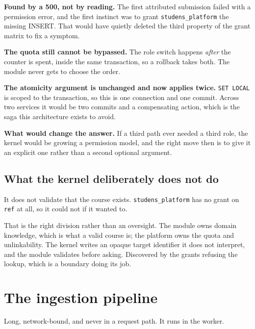 \documentclass[11pt,a4paper]{article}
\begin{document}
\begin{why}
\textbf{Found by a 500, not by reading.} The first attributed submission failed
with a permission error, and the first instinct was to grant
\texttt{studens\_platform} the missing INSERT. That would have quietly deleted
the third property of the grant matrix to fix a symptom.

\textbf{The quota still cannot be bypassed.} The role switch happens
\emph{after} the counter is spent, inside the same transaction, so a rollback
takes both. The module never gets to choose the order.

\textbf{The atomicity argument is unchanged and now applies twice.}
\texttt{SET LOCAL} is scoped to the transaction, so this is one connection and
one commit. Across two services it would be two commits and a compensating
action, which is the saga this architecture exists to avoid.

\textbf{What would change the answer.} If a third path ever needed a third role,
the kernel would be growing a permission model, and the right move then is to
give it an explicit one rather than a second optional argument.
\end{why}

\subsection{What the kernel deliberately does not do}

It does not validate that the course exists. \texttt{studens\_platform} has no
grant on \texttt{ref} at all, so it could not if it wanted to.

That is the right division rather than an oversight. The module owns domain
knowledge, which is what a valid course is; the platform owns the quota and
unlinkability. The kernel writes an opaque target identifier it does not
interpret, and the module validates before asking. Discovered by the grants
refusing the lookup, which is a boundary doing its job.

\newpage
\section{The ingestion pipeline}

Long, network-bound, and never in a request path. It runs in the worker.
\end{document}
